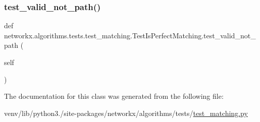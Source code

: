 \subsubsection{\texorpdfstring{test\+\_\+valid\+\_\+not\+\_\+path()}{test\_valid\_not\_path()}}
{\footnotesize\ttfamily def networkx.\+algorithms.\+tests.\+test\+\_\+matching.\+Test\+Is\+Perfect\+Matching.\+test\+\_\+valid\+\_\+not\+\_\+path (\begin{DoxyParamCaption}\item[{}]{self }\end{DoxyParamCaption})}



The documentation for this class was generated from the following file\+:\begin{DoxyCompactItemize}
\item 
venv/lib/python3./site-\/packages/networkx/algorithms/tests/\hyperlink{tests_2test__matching_8py}{test\+\_\+matching.\+py}\end{DoxyCompactItemize}

